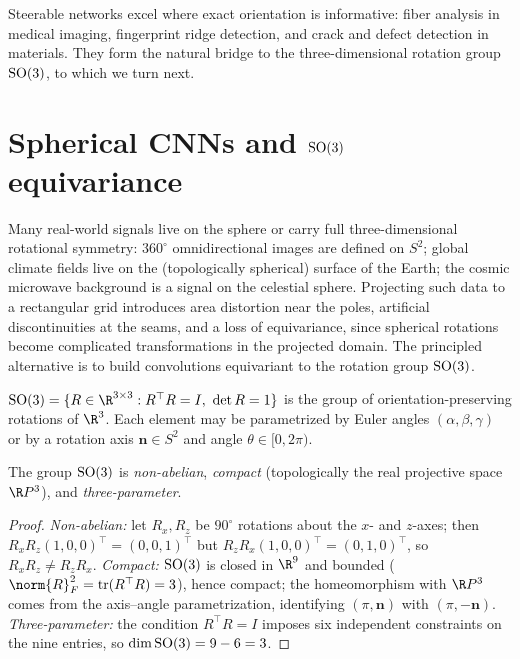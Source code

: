 Steerable networks excel where exact orientation is informative: fiber analysis
in medical imaging, fingerprint ridge detection, and crack and defect detection
in materials. They form the natural bridge to the three-dimensional rotation
group $\SO(3)$, to which we turn next.

\section{Spherical CNNs and $\SO(3)$ equivariance}
\label{sec:groups:spherical}

Many real-world signals live on the sphere or carry full three-dimensional
rotational symmetry: $360^\circ$ omnidirectional images are defined on $S^2$;
global climate fields live on the (topologically spherical) surface of the
Earth; the cosmic microwave background is a signal on the celestial sphere.
Projecting such data to a rectangular grid introduces area distortion near the
poles, artificial discontinuities at the seams, and a loss of equivariance,
since spherical rotations become complicated transformations in the projected
domain. The principled alternative is to build convolutions equivariant to the
rotation group $\SO(3)$.

\begin{definition}
\label{def:groups:so3}
$\SO(3) = \{R \in \R^{3 \times 3} : R^\top R = I,\ \det R = 1\}$ is the group of
orientation-preserving rotations of $\R^3$. Each element may be parametrized by
Euler angles $(\alpha, \beta, \gamma)$ or by a rotation axis $\mathbf{n} \in S^2$
and angle $\theta \in [0, 2\pi)$.
\end{definition}

\begin{proposition}[Properties of $\SO(3)$]
\label{prop:groups:so3-properties}
The group $\SO(3)$ is \emph{non-abelian}, \emph{compact} (topologically the real
projective space $\R P^3$), and \emph{three-parameter}.
\end{proposition}

\begin{proof}
\emph{Non-abelian:} let $R_x, R_z$ be $90^\circ$ rotations about the $x$- and
$z$-axes; then $R_x R_z (1,0,0)^\top = (0,0,1)^\top$ but $R_z R_x (1,0,0)^\top =
(0,1,0)^\top$, so $R_x R_z \neq R_z R_x$. \emph{Compact:} $\SO(3)$ is closed in
$\R^9$ and bounded ($\norm{R}_F^2 = \operatorname{tr}(R^\top R) = 3$), hence
compact; the homeomorphism with $\R P^3$ comes from the axis--angle
parametrization, identifying $(\pi, \mathbf{n})$ with $(\pi, -\mathbf{n})$.
\emph{Three-parameter:} the condition $R^\top R = I$ imposes six independent
constraints on the nine entries, so $\dim \operatorname{SO}(3) = 9 - 6 = 3$.
\end{proof}

